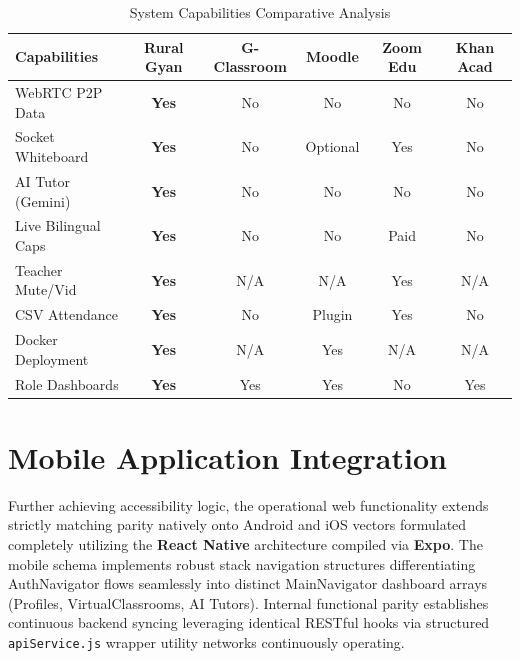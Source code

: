 \documentclass[12pt, journal, onecolumn]{IEEEtran}
\begin{document}
\begin{table}[htbp]
\centering
\caption{System Capabilities Comparative Analysis}
\begin{tabularx}{\columnwidth}{@{}l|c|c|c|c|c@{}}
\toprule
\textbf{Capabilities} & \textbf{Rural Gyan} & \textbf{G-Classroom} & \textbf{Moodle} & \textbf{Zoom Edu} & \textbf{Khan Acad} \\ \midrule
WebRTC P2P Data & \textbf{Yes} & No & No & No & No \\
Socket Whiteboard & \textbf{Yes} & No & Optional & Yes & No \\
AI Tutor (Gemini) & \textbf{Yes} & No & No & No & No \\
Live Bilingual Caps & \textbf{Yes} & No & No & Paid & No \\
Teacher Mute/Vid & \textbf{Yes} & N/A & N/A & Yes & N/A \\
CSV Attendance & \textbf{Yes} & No & Plugin & Yes & No \\
Docker Deployment & \textbf{Yes} & N/A & Yes & N/A & N/A \\
Role Dashboards & \textbf{Yes} & Yes & Yes & No & Yes \\ \bottomrule
\end{tabularx}
\label{tab:comparison}
\end{table}

\section{Mobile Application Integration}
Further achieving accessibility logic, the operational web functionality extends strictly matching parity natively onto Android and iOS vectors formulated completely utilizing the \textbf{React Native} architecture compiled via \textbf{Expo}. The mobile schema implements robust stack navigation structures differentiating AuthNavigator flows seamlessly into distinct MainNavigator dashboard arrays (Profiles, VirtualClassrooms, AI Tutors). Internal functional parity establishes continuous backend syncing leveraging identical RESTful hooks via structured \texttt{apiService.js} wrapper utility networks continuously operating.
\end{document}
